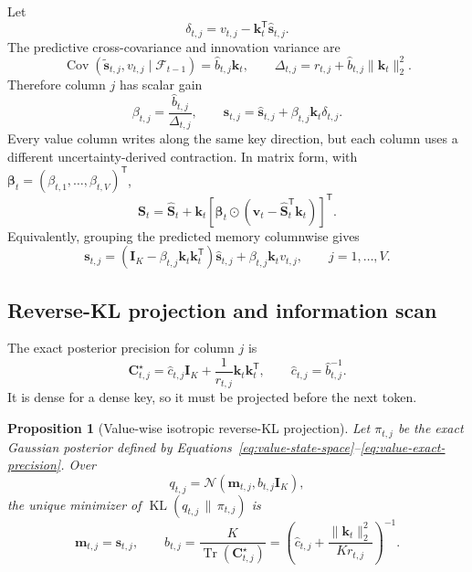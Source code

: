 \documentclass[11pt]{article}
\newcommand{\ve}[1]{\boldsymbol{#1}}
\newcommand{\tr}{\mathsf{T}}
\newcommand{\Cov}{\operatorname{Cov}}
\newcommand{\KL}{\operatorname{KL}}
\newcommand{\Tr}{\operatorname{Tr}}
\newcommand{\Normal}{\mathcal{N}}
\newtheorem{proposition}{Proposition}
\begin{document}
Let
\begin{equation}
  \delta_{t,j}=v_{t,j}-\ve{k}_t^{\tr}\widehat{\ve{s}}_{t,j}.
  \label{eq:value-innovation}
\end{equation}
The predictive cross-covariance and innovation variance are
\begin{equation}
  \Cov(\widetilde{\ve{s}}_{t,j},v_{t,j}\mid\mathcal{F}_{t-1})
  =\widehat b_{t,j}\ve{k}_t,
  \qquad
  \Delta_{t,j}=r_{t,j}+\widehat b_{t,j}\|\ve{k}_t\|_2^2.
  \label{eq:value-joint-moments}
\end{equation}
Therefore column $j$ has scalar gain
\begin{equation}
  \beta_{t,j}=\frac{\widehat b_{t,j}}{\Delta_{t,j}},
  \qquad
  \ve{s}_{t,j}
  =\widehat{\ve{s}}_{t,j}+\beta_{t,j}\ve{k}_t\delta_{t,j}.
  \label{eq:value-gain}
\end{equation}
Every value column writes along the same key direction, but each column uses a different
uncertainty-derived contraction.  In matrix form, with
$\ve{\beta}_t=(\beta_{t,1},\ldots,\beta_{t,V})^{\tr}$,
\begin{equation}
  \ve{S}_t
  =\widehat{\ve{S}}_t
  +\ve{k}_t
   \left[
     \ve{\beta}_t\odot
     \left(\ve{v}_t-\widehat{\ve{S}}_t^{\tr}\ve{k}_t\right)
   \right]^{\tr}.
  \label{eq:value-memory-update}
\end{equation}
Equivalently, grouping the predicted memory columnwise gives
\begin{equation}
  \ve{s}_{t,j}
  =\left(
     \ve{I}_K-\beta_{t,j}\ve{k}_t\ve{k}_t^{\tr}
   \right)\widehat{\ve{s}}_{t,j}
   +\beta_{t,j}\ve{k}_tv_{t,j},
  \qquad j=1,\ldots,V.
  \label{eq:value-memory-column-factorized}
\end{equation}

\subsection{Reverse-KL projection and information scan}

The exact posterior precision for column $j$ is
\begin{equation}
  \ve{C}_{t,j}^{\star}
  =\widehat c_{t,j}\ve{I}_K
   +\frac{1}{r_{t,j}}\ve{k}_t\ve{k}_t^{\tr},
  \qquad
  \widehat c_{t,j}=\widehat b_{t,j}^{-1}.
  \label{eq:value-exact-precision}
\end{equation}
It is dense for a dense key, so it must be projected before the next token.

\begin{proposition}[Value-wise isotropic reverse-KL projection]
Let $\pi_{t,j}$ be the exact Gaussian posterior defined by
Equations~\eqref{eq:value-state-space}--\eqref{eq:value-exact-precision}.  Over
\begin{equation*}
  q_{t,j}=\Normal(\ve{m}_{t,j},b_{t,j}\ve{I}_K),
\end{equation*}
the unique minimizer of $\KL(q_{t,j}\,\|\,\pi_{t,j})$ is
\begin{equation}
  \ve{m}_{t,j}=\ve{s}_{t,j},
  \qquad
  b_{t,j}
  =\frac{K}{\Tr(\ve{C}_{t,j}^{\star})}
  =\left(
    \widehat c_{t,j}
    +\frac{\|\ve{k}_t\|_2^2}{K r_{t,j}}
  \right)^{-1}.
  \label{eq:value-reverse-kl}
\end{equation}
\end{proposition}
\end{document}
